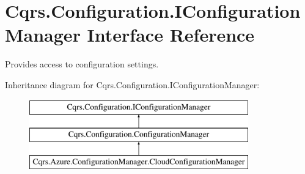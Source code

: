 \hypertarget{interfaceCqrs_1_1Configuration_1_1IConfigurationManager}{}\section{Cqrs.\+Configuration.\+I\+Configuration\+Manager Interface Reference}
\label{interfaceCqrs_1_1Configuration_1_1IConfigurationManager}


Provides access to configuration settings.  


Inheritance diagram for Cqrs.\+Configuration.\+I\+Configuration\+Manager\+:\begin{figure}[H]
\begin{center}
\leavevmode
\includegraphics[height=3.000000cm]{interfaceCqrs_1_1Configuration_1_1IConfigurationManager}
\end{center}
\end{figure}
